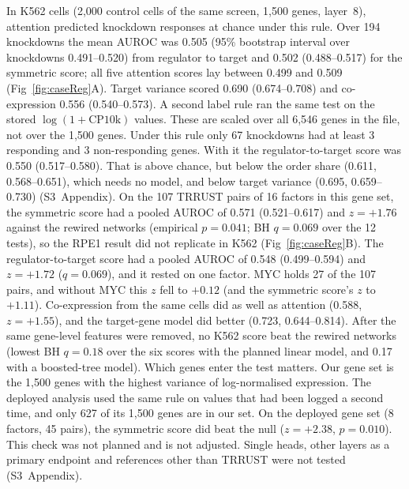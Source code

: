 In K562 cells (2,000 control cells of the same screen, 1,500 genes,
layer~8), attention predicted knockdown responses at chance under this
rule. Over 194 knockdowns the mean AUROC was 0.505 (95\%
bootstrap interval over knockdowns 0.491--0.520) from regulator to target
and 0.502 (0.488--0.517) for the symmetric score; all five attention
scores lay between 0.499 and 0.509 (Fig~\ref{fig:caseReg}A). Target
variance scored 0.690 (0.674--0.708) and co-expression 0.556
(0.540--0.573). A second label rule ran the same test on the stored
$\log(1+\text{CP10k})$ values. These are scaled over all 6,546 genes in
the file, not over the 1,500 genes. Under this rule only 67 knockdowns
had at least 3 responding and 3 non-responding genes. With it
the regulator-to-target score was 0.550 (0.517--0.580). That is above
chance, but below the order share (0.611, 0.568--0.651), which needs no
model, and below target variance (0.695, 0.659--0.730) (S3~Appendix).
On the 107 TRRUST pairs of 16 factors in this gene set, the symmetric
score had a pooled AUROC of 0.571 (0.521--0.617) and $z = +1.76$ against
the rewired networks (empirical $p = 0.041$; BH $q = 0.069$ over the 12
tests), so the RPE1 result did not replicate in K562
(Fig~\ref{fig:caseReg}B). The regulator-to-target score had a pooled
AUROC of 0.548 (0.499--0.594) and $z = +1.72$ ($q = 0.069$), and it
rested on one factor. MYC holds 27 of the 107 pairs, and without MYC
this $z$ fell to $+0.12$ (and the symmetric score's $z$ to $+1.11$).
Co-expression from the same cells did as well as attention (0.588,
$z = +1.55$), and the target-gene model did better (0.723,
0.644--0.814). After the same gene-level features were removed, no K562
score beat the rewired networks (lowest BH $q = 0.18$ over the six
scores with the planned linear model, and 0.17 with a boosted-tree
model). Which genes enter the test matters. Our gene set is the 1,500
genes with the highest variance of log-normalised expression. The
deployed analysis used the same rule on values that had been logged a
second time, and only 627 of its 1,500 genes are in our set. On the
deployed gene set (8 factors, 45 pairs), the symmetric score did beat
the null ($z = +2.38$, $p = 0.010$). This check was not planned and is
not adjusted. Single heads, other layers as a primary endpoint and
references other than TRRUST were not tested (S3~Appendix).

